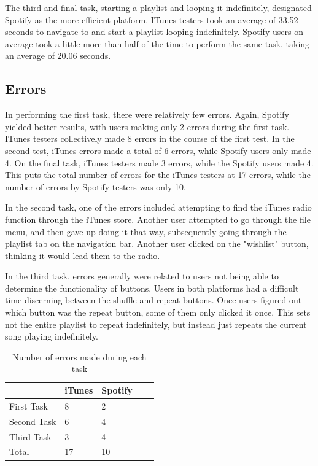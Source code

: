\documentclass[12pt]{report}
\begin{document}
The third and final task, starting a playlist and looping it indefinitely, designated Spotify as the more efficient platform. ITunes testers took an average of 33.52 seconds to navigate to and start a playlist looping indefinitely. Spotify users on average took a little more than half of the time to perform the same task, taking an average of 20.06 seconds.

\subsection{Errors}

In performing the first task, there were relatively few errors. Again, Spotify yielded better results, with users making only 2 errors during the first task. ITunes testers collectively made 8 errors in the course of the first test. In the second test, iTunes errors made a total of 6 errors, while Spotify users only made 4. On the final task, iTunes testers made 3 errors, while the Spotify users made 4. This puts the total number of errors for the iTunes testers at 17 errors, while the number of errors by Spotify testers was only 10.

In the second task, one of the errors included attempting to find the iTunes radio function through the iTunes store. Another user attempted to go through the file menu, and then gave up doing it that way, subsequently going through the playlist tab on the navigation bar. Another user clicked on the "wishlist" button, thinking it would lead them to the radio.

In the third task, errors generally were related to users not being able to determine the functionality of buttons. Users in both platforms had a difficult time discerning between the shuffle and repeat buttons. Once users figured out which button was the repeat button, some of them only clicked it once. This sets not the entire playlist to repeat indefinitely, but instead just repeats the current song playing indefinitely.

\begin{table}[h]
\centering
\begin{tabular}{lllll}
\hline
            & iTunes & Spotify &  &  \\ \hline
First Task  & 8      & 2       &  &  \\
Second Task & 6      & 4       &  &  \\
Third Task  & 3      & 4       &  &  \\ \hline
Total       & 17     & 10      &  & 
\end{tabular}
\caption{Number of errors made during each task}
\end{table}
\end{document}
